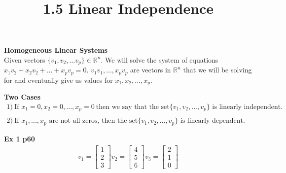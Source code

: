 \documentclass{article}
\title{1.5 Linear Independence}
\begin{document}
  \maketitle
  \textbf{Homogeneous Linear Systems}\\
  Given vectors $ \{v_{1},v_{2},...v_{p}\} \in \mathbb{R}^{n} $. We will solve the system of equations $ x_{1}v_{2}+x_{2}v_{2}+...+x_{p}v_{p}=0$. $ v_{1}v_{1}, ..., x_{p}v_{p}$ are vectors in $\mathbb{R}^{n}$ that we will be solving for and eventually give us values for $ x_{1},x_{2},...,x_{p}$.

  \textbf{Two Cases}
  \[
    \begin{gathered}
      1)~\text{If } x_{1}=0, x_{2}=0,...,x_{p}=0~\text{then we say that the set} \{v_{1},v_{2},...,v_{p}\} \text{ is linearly independent.} \\
      ~\\
      2)~\text{If } x_{1},...,x_{p} \text{ are not all zeros, then the set} \{v_{1},v_{2},...,v_{p}\} \text{ is linearly dependent.} 
    \end{gathered}
  \]

  \textbf{Ex 1 p60}
  \[
    \begin{gathered}
    v_{1}= \begin{bmatrix}
      1\\
      2\\
      3
    \end{bmatrix}
    v_{2} = \begin{bmatrix}
      4\\
      5\\
      6
    \end{bmatrix}
    v_{3}=\begin{bmatrix}
      2\\
      1\\
      0
    \end{bmatrix} \\
    \end{gathered}
  \]
  
\end{document}
